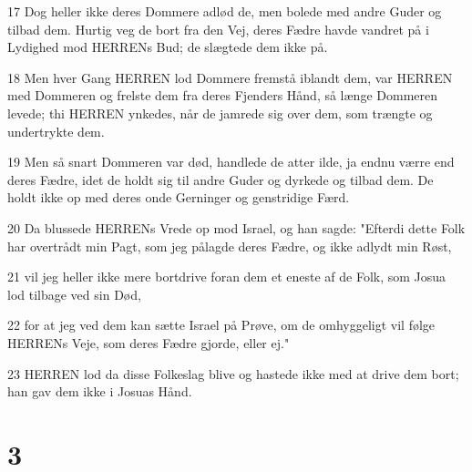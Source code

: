 \par 17 Dog heller ikke deres Dommere adlød de, men bolede med andre Guder og tilbad dem. Hurtig veg de bort fra den Vej, deres Fædre havde vandret på i Lydighed mod HERRENs Bud; de slægtede dem ikke på.
\par 18 Men hver Gang HERREN lod Dommere fremstå iblandt dem, var HERREN med Dommeren og frelste dem fra deres Fjenders Hånd, så længe Dommeren levede; thi HERREN ynkedes, når de jamrede sig over dem, som trængte og undertrykte dem.
\par 19 Men så snart Dommeren var død, handlede de atter ilde, ja endnu værre end deres Fædre, idet de holdt sig til andre Guder og dyrkede og tilbad dem. De holdt ikke op med deres onde Gerninger og genstridige Færd.
\par 20 Da blussede HERRENs Vrede op mod Israel, og han sagde: "Efterdi dette Folk har overtrådt min Pagt, som jeg pålagde deres Fædre, og ikke adlydt min Røst,
\par 21 vil jeg heller ikke mere bortdrive foran dem et eneste af de Folk, som Josua lod tilbage ved sin Død,
\par 22 for at jeg ved dem kan sætte Israel på Prøve, om de omhyggeligt vil følge HERRENs Veje, som deres Fædre gjorde, eller ej."
\par 23 HERREN lod da disse Folkeslag blive og hastede ikke med at drive dem bort; han gav dem ikke i Josuas Hånd.

\chapter{3}


